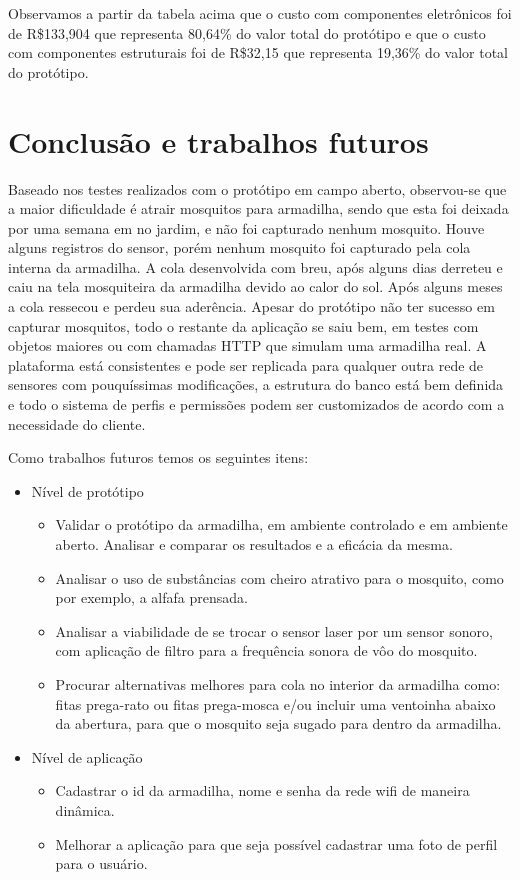 \documentclass[
	12pt,				%
	openright,			%
	oneside,			%
	a4paper,			%
	chapter=TITLE,		%
	english,			%
	brazil				%
	]{abntex2}
\begin{document}
Observamos a partir da tabela acima que o custo com componentes eletrônicos foi de R\$133,904 que representa 80,64\% do valor total do protótipo e que o custo com 
componentes estruturais foi de R\$32,15 que representa 19,36\% do valor total do protótipo.

\chapter{Conclusão e trabalhos futuros}

Baseado nos testes realizados com o protótipo em campo aberto, observou-se que a maior dificuldade é atrair mosquitos para armadilha, sendo que esta foi deixada por uma semana em
no jardim, e não foi capturado nenhum mosquito. Houve alguns registros do  sensor, porém nenhum mosquito foi capturado pela cola interna da armadilha. A cola desenvolvida com breu,
após alguns dias derreteu e caiu na tela mosquiteira da armadilha devido ao calor do sol. Após alguns meses a cola ressecou e perdeu sua aderência. Apesar do protótipo
não ter sucesso em capturar mosquitos, todo o restante da aplicação se saiu bem, em testes com objetos maiores ou com chamadas HTTP que simulam uma armadilha real. A plataforma está 
consistentes e pode ser replicada para qualquer outra rede de sensores com pouquíssimas modificações, a estrutura do banco está bem definida e todo o sistema de perfis e 
permissões podem ser customizados de acordo com a necessidade do cliente.

Como trabalhos futuros temos os seguintes itens: 

\begin{itemize}
    \item Nível de protótipo
    \begin{itemize}
        \item Validar o protótipo da armadilha, em ambiente controlado e em ambiente aberto. Analisar e comparar os resultados e a eficácia da mesma.
        \item Analisar o uso de substâncias com cheiro atrativo para o mosquito, como por exemplo, a alfafa prensada.
        \item Analisar a viabilidade de se trocar o sensor laser por um sensor sonoro, com aplicação de filtro para a frequência sonora de vôo do mosquito.
        \item Procurar alternativas melhores para cola no interior da armadilha como: fitas prega-rato ou fitas prega-mosca e/ou incluir uma 
        ventoinha abaixo da abertura, para que o mosquito seja sugado para dentro da armadilha.
    \end{itemize}
    \item Nível de aplicação
    \begin{itemize}
        \item Cadastrar o id da armadilha, nome e senha da rede wifi de maneira dinâmica.
        \item Melhorar a aplicação para que seja possível cadastrar uma foto de perfil para o usuário.
    \end{itemize}   
\end{itemize}
\end{document}
